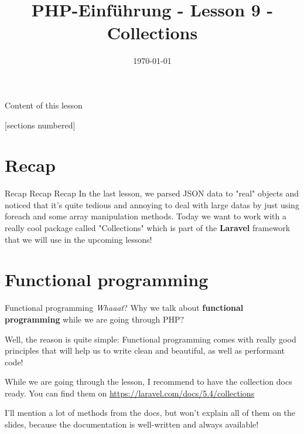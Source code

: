 


\newcommand{\topic}{
	PHP-Einführung - Lesson 9 - Collections
}

\title{\topic}
\date{\today}



\maketitle

\begin{frame}{Content of this lesson}

	[sections numbered]
	\tableofcontents

\end{frame}

\section{Recap}

\begin{frame}{Recap Recap Recap}
	In the last lesson, we parsed JSON data to "real" objects and noticed that it's quite tedious and annoying to deal with large datas by just using foreach and some array manipulation methods. \pause Today we want to work with a really cool package called "Collections" which is part of the \textbf{Laravel} framework that we will use in the upcoming lessons!
\end{frame}

\section{Functional programming}

\begin{frame}{Functional programming}
	\textit{Whaaat}? Why we talk about \textbf{functional programming} while we are going through PHP? \pause
	
	Well, the reason is quite simple: Functional programming comes with really good principles that will help us to write clean and beautiful, as well as performant code! \pause
	
	While we are going through the lesson, I recommend to have the collection docs ready. You can find them on \url{https://laravel.com/docs/5.4/collections}
	
	I'll mention a lot of methods from the docs, but won't explain all of them on the slides, because the documentation is well-written and always available! 
\end{frame}


